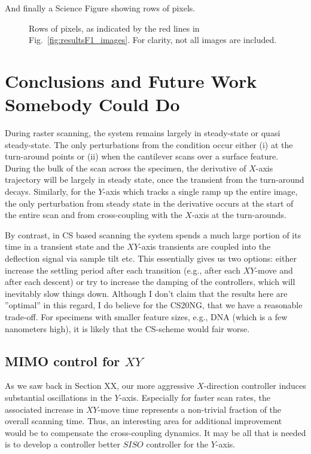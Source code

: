 \documentclass[11pt]{article}
\begin{document}
And finally a Science Figure showing rows of pixels.

\begin{figure}
    
    \caption{Rows of pixels, as indicated by the red lines in Fig.~\ref{fig:resultsF1_images}. For clarity, not all images are included.}  
    \label{fig: }
\end{figure}

\section{Conclusions and Future Work Somebody Could Do}

During raster scanning, the system remains largely in steady-state or quasi steady-state. The only perturbations from the condition occur either (i) at the turn-around points or (ii) when the cantilever scans over a surface feature. During the bulk of the scan across the specimen, the derivative of $X$-axis trajectory will be largely in steady state, once the transient from the turn-around decays. Similarly, for the $Y$-axis which tracks a single ramp up the entire image, the only perturbation from steady state in the derivative occurs at the start of the entire scan and from cross-coupling with the $X$-axis at the turn-arounds. 

By contrast, in CS based scanning the system spends a much large portion of its time in a transient state and the $XY$-axis transients are coupled into the deflection signal via sample tilt etc. This essentially gives us two options: either increase the settling period after each transition (e.g., after each $XY$-move and after each descent) or try to increase the damping of the controllers, which will inevitably slow things down.
Although I don't claim that the results here are ''optimal'' in this regard, I do believe for the CS20NG, that we have a reasonable trade-off. For specimens with smaller feature sizes, e.g., DNA (which is a few 
nanometers high), it is likely that the CS-scheme would fair worse. 


\subsection{MIMO control for $XY$}
As we saw back in Section XX, our more aggressive $X$-direction controller induces substantial oscillations in the $Y$-axis. Especially for faster scan rates, the associated increase in $XY$-move time represents a non-trivial fraction of the overall scanning time. Thus, an interesting area for additional improvement would be to compensate the cross-coupling dynamics. It may be all that is needed is to develop a controller better $SISO$ controller for the $Y$-axis.
\end{document}
